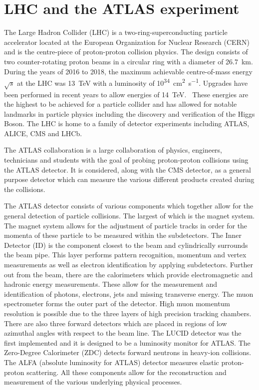 \documentclass[a4paper,11pt]{article}
\begin{document}
\section{LHC and the ATLAS experiment}
The Large Hadron Collider (LHC) is a two-ring-superconducting particle accelerator located at the European Organization for Nuclear Research (CERN) and is the centre-piece of proton-proton collision physics.
The design consists of two counter-rotating proton beams in a circular ring with a diameter of \SI{26.7}{\kilo\metre}.
During the years of 2016 to 2018, the maximum achievable centre-of-mass energy $\sqrt{s}$ at the LHC was \SI{13}{\tera\electronvolt} with a luminosity of \si{10^{34}\centi\metre\squared\per\second}.
Upgrades have been performed in recent years to allow energies of \SI{14}{\tera\electronvolt}.~\nocite{Evans:2008zzb}
These energies are the highest to be achieved for a particle collider and has allowed for notable landmarks in particle physics including the discovery and verification of the Higgs Boson.
The LHC is home to a family of detector experiments including ATLAS, ALICE, CMS and LHCb.

The ATLAS collaboration is a large collaboration of physics, engineers, technicians and students with the goal of probing proton-proton collisions using the ATLAS detector.
It is considered, along with the CMS detector, as a general purpose detector which can measure the various different products created during the collisions.

The ATLAS detector consists of various components which together allow for the general detection of particle collisions.
The largest of which is the magnet system.
The magnet system allows for the adjustment of particle tracks in order for the momenta of these particle to be measured within the subdetectors.
The Inner Detector (ID) is the component closest to the beam and cylindrically surrounds the beam pipe.
This layer performs pattern recognition, momentum and vertex measurements as well as electron identification by applying subdetectors.
Further out from the beam, there are the calorimeters which provide electromagnetic and hadronic energy measurements.
These allow for the measurement and identification of photons, electrons, jets and missing transverse energy.
The muon spectrometer forms the outer part of the detector.
High muon momentum resolution is possible due to the three layers of high precision tracking chambers.
There are also three forward detectors which are placed in regions of low azimuthal angles with respect to the beam line.
The LUCID detector was the first implemented and it is designed to be a luminosity monitor for ATLAS.
The Zero-Degree Calorimeter (ZDC) detects forward neutrons in heavy-ion collisions.
The ALFA (absolute luminosity for ATLAS) detector measures elastic proton-proton scattering.
All these components allow for the reconstruction and measurement of the various underlying physical processes.
\end{document}
